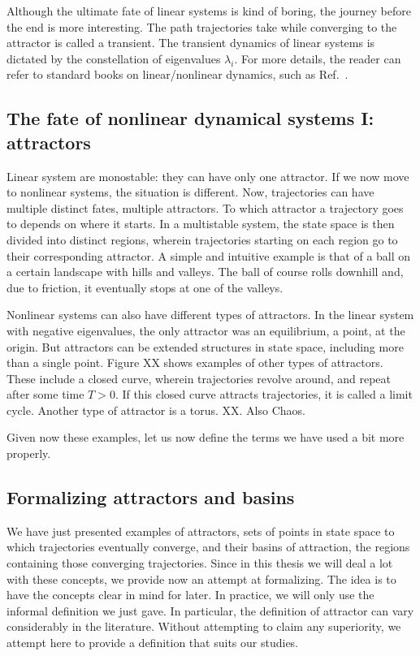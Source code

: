 Although the ultimate fate of linear systems is kind of boring, the journey before the end is more interesting. The path trajectories take while converging to the attractor is called a transient. The transient dynamics of linear systems is dictated by the constellation of eigenvalues $\lambda_i$. For more details, the reader can refer to standard books on linear/nonlinear dynamics, such as Ref.~\cite{strogatz2002nonlinear}. 


\subsection{The fate of nonlinear dynamical systems I: attractors}
Linear system are monostable: they can have only one attractor. If we now move to nonlinear systems, the situation is different. Now, trajectories can have multiple distinct fates, multiple attractors. To which attractor a trajectory goes to depends on where it starts. In a multistable system, the state space is then divided into distinct regions, wherein trajectories starting on each region go to their corresponding attractor. A simple and intuitive example is that of a ball on a certain landscape with hills and valleys. The ball of course rolls downhill and, due to friction, it eventually stops at one of the valleys.


Nonlinear systems can also have different types of attractors. In the linear system with negative eigenvalues, the only attractor was an equilibrium, a point, at the origin. But attractors can be extended structures in state space, including more than a single point. Figure XX shows examples of other types of attractors. These include a closed curve, wherein trajectories revolve around, and repeat after some time $T>0$. If this closed curve attracts trajectories, it is called a limit cycle. Another type of attractor is a torus. XX. Also Chaos. 

Given now these examples, let us now define the terms we have used a bit more properly. 


\subsection{Formalizing attractors and basins}
We have just presented examples of attractors, sets of points in state space to which trajectories eventually converge, and their basins of attraction, the regions containing those converging trajectories. Since in this thesis we will deal a lot with these concepts, we provide now an attempt at formalizing. The idea is to have the concepts clear in mind for later. In practice, we will only use the informal definition we just gave. In particular, the definition of attractor can vary considerably in the literature. Without attempting to claim any superiority, we attempt here to provide a definition that suits our studies.  

